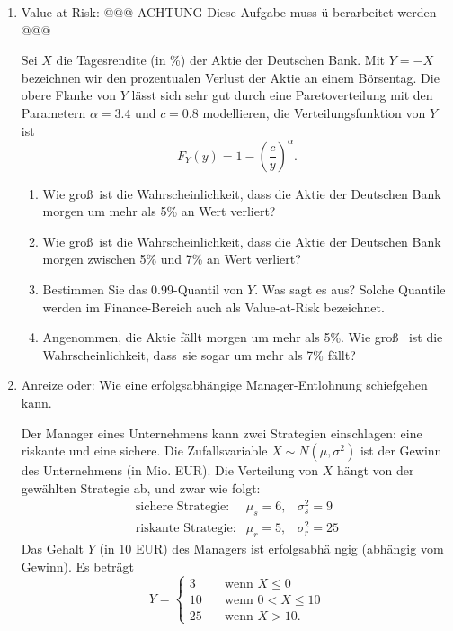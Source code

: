 \begin{enumerate}
\item Value-at-Risk: @@@ ACHTUNG Diese Aufgabe muss \"{u}%
berarbeitet werden @@@

Sei $X$ die Tagesrendite (in \%) der Aktie der Deutschen Bank. Mit $Y=-X$
bezeichnen wir den prozentualen Verlust der Aktie an einem B\"{o}rsentag.
Die obere Flanke von $Y$ l\"{a}sst sich sehr gut durch eine Paretoverteilung
mit den Parametern $\alpha =3.4$ und $c=0.8$ modellieren, die
Verteilungsfunktion von $Y$ ist%
\begin{equation*}
F_{Y}(y)=1-\left( \frac{c}{y}\right) ^{\alpha }.
\end{equation*}
\begin{enumerate}
\item Wie gro\ss\ ist die Wahrscheinlichkeit, dass die Aktie der Deutschen
Bank morgen um mehr als 5\% an Wert verliert?
\item Wie gro\ss\ ist die Wahrscheinlichkeit, dass die Aktie der Deutschen
Bank morgen zwischen 5\% und 7\% an Wert verliert?
\item Bestimmen Sie das 0.99-Quantil von $Y$. Was sagt es aus? Solche
Quantile werden im Finance-Bereich auch als Value-at-Risk bezeichnet.
\item Angenommen, die Aktie f\"{a}llt morgen um mehr als 5\%. Wie gro\ss\ %
ist die Wahrscheinlichkeit, dass\ sie sogar um mehr als 7\% f\"{a}llt?
\end{enumerate}

\item Anreize oder: Wie eine erfolgsabh\"{a}ngige
Manager-Entlohnung schiefgehen kann.

Der Manager eines Unternehmens kann zwei Strategien einschlagen: eine
riskante und eine sichere. Die Zufallsvariable $X\sim N\left( \mu ,\sigma
^{2}\right) $ ist der Gewinn des Unternehmens (in Mio. EUR). Die Verteilung
von $X$ h\"{a}ngt von der gew\"{a}hlten Strategie ab, und zwar wie folgt:%
\begin{equation*}
\begin{array}{lll}
\text{sichere Strategie:} & \mu _{s}=6, & \sigma _{s}^{2}=9 \\ 
\text{riskante Strategie:} & \mu _{r}=5, & \sigma _{r}^{2}=25%
\end{array}%
\end{equation*}%
Das Gehalt $Y$ (in 10 EUR) des Managers ist erfolgsabh\"{a}%
ngig (abh\"{a}ngig vom Gewinn). Es betr\"{a}gt%
\begin{equation*}
Y=\left\{ 
\begin{array}{rl}
3 & \quad \text{wenn }X\leq 0 \\ 
10 & \quad \text{wenn }0<X\leq 10 \\ 
25 & \quad \text{wenn }X>10.%
\end{array}%
\right.
\end{equation*}


\end{enumerate}

